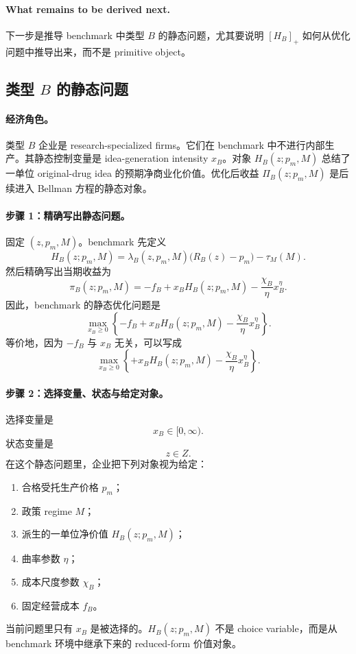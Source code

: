 \paragraph{What remains to be derived next.}
下一步是推导 benchmark 中类型 $B$ 的静态问题，尤其要说明 $[H_B]_+$ 如何从优化问题中推导出来，而不是 primitive object。

\subsection{类型 $B$ 的静态问题}

\paragraph{经济角色。}
类型 $B$ 企业是 research-specialized firms。它们在 benchmark 中不进行内部生产。其静态控制变量是 idea-generation intensity $x_B$。对象 $H_B(z;p_m,M)$ 总结了一单位 original-drug idea 的预期净商业化价值。优化后收益 $\Pi_B(z;p_m,M)$ 是后续进入 Bellman 方程的静态对象。

\paragraph{步骤 1：精确写出静态问题。}
固定 $(z,p_m,M)$。benchmark 先定义
\begin{equation}
H_B(z;p_m,M)=\lambda_B(z,p_m,M)\bigl(R_B(z)-p_m\bigr)-\tau_M(M).
\label{eq:p2B_HB}
\end{equation}
然后精确写出当期收益为
\begin{equation}
\pi_B(z;p_m,M)
=
-f_B+x_BH_B(z;p_m,M)-\frac{\chi_B}{\eta}x_B^\eta.
\label{eq:p2B_payoff_primitive}
\end{equation}
因此，benchmark 的静态优化问题是
\begin{equation}
\max_{x_B\ge 0}
\left\{
-f_B+x_BH_B(z;p_m,M)-\frac{\chi_B}{\eta}x_B^\eta
\right\}.
\label{eq:p2B_problem}
\end{equation}
等价地，因为 $-f_B$ 与 $x_B$ 无关，可以写成
\begin{equation}
\max_{x_B\ge 0}
\left\{
+x_BH_B(z;p_m,M)-\frac{\chi_B}{\eta}x_B^\eta
\right\}.
\label{eq:p2B_problem_reduced}
\end{equation}

\paragraph{步骤 2：选择变量、状态与给定对象。}
选择变量是
\[
x_B\in[0,\infty).
\]
状态变量是
\[
z\in Z.
\]
在这个静态问题里，企业把下列对象视为给定：
\begin{enumerate}
    \item 合格受托生产价格 $p_m$；
    \item 政策 regime $M$；
    \item 派生的一单位净价值 $H_B(z;p_m,M)$；
    \item 曲率参数 $\eta$；
    \item 成本尺度参数 $\chi_B$；
    \item 固定经营成本 $f_B$。
\end{enumerate}
当前问题里只有 $x_B$ 是被选择的。$H_B(z;p_m,M)$ 不是 choice variable，而是从 benchmark 环境中继承下来的 reduced-form 价值对象。

